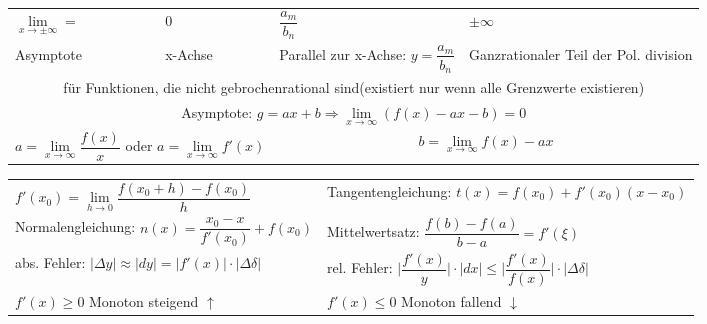 \begin{table}[h!]
\begin{center}
\begin{tabularx}{540pt}{|p{50pt}|p{80pt}|X|X|}
		$\lim\limits_{x\rightarrow\pm\infty} = $&
		0&
		$\dfrac{a_m}{b_n}$&
		$\pm\infty$\\
		
		Asymptote&
		x-Achse&
		Parallel zur x-Achse: \newline
		$y=\dfrac{a_m}{b_n}$&
		Ganzrationaler Teil der Pol. division\\
		
		\hline
		\multicolumn{4}{|c|}{für Funktionen, die nicht gebrochenrational sind(existiert nur wenn alle Grenzwerte existieren)}\\
		\hline
		\multicolumn{4}{|c|}{Asymptote: $g=ax+b \Rightarrow \lim\limits_{x\to \infty}(f(x)-ax-b)=0$}\\
		
		
		\multicolumn{2}{|c}{$a= \lim\limits_{x\to\infty}\dfrac{f(x)}{x}$ oder $a= \lim\limits_{x\to\infty}f'(x)$}&
		\multicolumn{2}{|c|}{$b=\lim\limits_{x\to\infty}f(x)-ax$}\\
		\hline
		\end{tabularx}		

		\begin{tabularx}{540pt}{|X|X|}
		\hline
		\rowcolor{Gray}
		\multicolumn{2}{|c|}{\textbf{Differentialrechnung}}\\
		\hline
		
		$f'(x_0) = \lim\limits_{h\to 0}\dfrac{f(x_0+h)-f(x_0)}{h}$&
		Tangentengleichung: $t(x)=f(x_0) + f'(x_0)(x-x_0)$\\
		\hline
		Normalengleichung: $n(x)=\dfrac{x_0-x}{f'(x_0)}+f(x_0)$&
		Mittelwertsatz:  $\dfrac{f(b)-f(a)}{b-a}=f'(\xi)$\\
		\hline
		abs. Fehler: $|\Delta y|\approx|dy|=|f'(x)|\cdot|\Delta\delta|$&
		rel. Fehler: $\bigg|\dfrac{f'(x)}{y}\bigg|\cdot |dx| \leq \bigg|\dfrac{f'(x)}{f(x)}\bigg|\cdot|\Delta\delta|$\\
		\hline
		
		$f'(x) \geq 0$ Monoton steigend $\uparrow$ &
		$f'(x) \leq 0$ Monoton fallend $\downarrow$\\
		\hline

		\end{tabularx}	
		

	\end{center}
	\end{table}	
	
